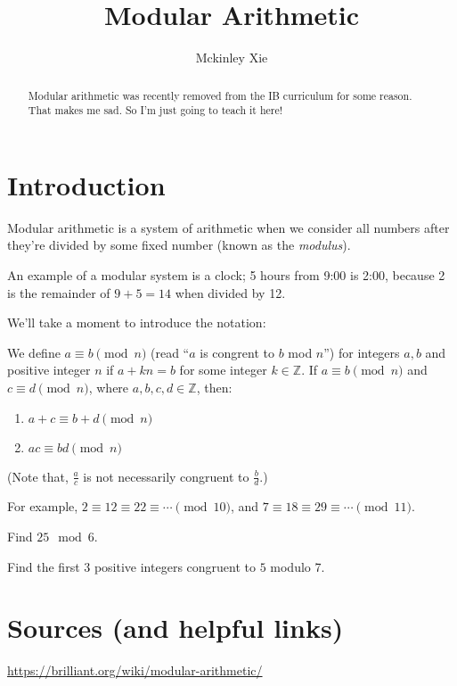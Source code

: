 \documentclass[a4paper]{scrartcl}
\title{Modular Arithmetic}
\author{Mckinley Xie}
\begin{document}
\maketitle
\begin{abstract}
	Modular arithmetic was recently removed from the IB curriculum for some reason. That makes me sad. So I'm just going to teach it here! 
\end{abstract}

\section{Introduction}
Modular arithmetic is a system of arithmetic when we consider all numbers after they're divided by some fixed number (known as the \emph{modulus}).

An example of a modular system is a clock; 5 hours from 9:00 is 2:00, because 2 is the remainder of $9 + 5 = 14$ when divided by 12.

We'll take a moment to introduce the notation:
\begin{theorem}
	We define $a \equiv b \pmod{n}$ (read ``$a$ is congrent to $b$ mod $n$'') for integers $a,b$ and positive integer $n$ if $a + kn = b$ for some integer $k \in \mathbb{Z}$.
	If $a \equiv b \pmod n$ and $c \equiv d \pmod n$, where $a,b,c,d \in \mathbb{Z}$, then:
	\begin{enumerate}
		\item $a + c \equiv b + d \pmod n$
		\item $ac \equiv bd \pmod n$
	\end{enumerate}
	(Note that, $\frac ac$ is not necessarily congruent to $\frac bd$.)
\end{theorem}
For example, $2 \equiv 12 \equiv 22 \equiv \cdots \pmod{10}$, and $7 \equiv 18 \equiv 29 \equiv \cdots \pmod{11}$.

\begin{exercise}
	Find $25 \mod 6$.
\end{exercise}
\begin{exercise}
	Find the first 3 positive integers congruent to $5$ modulo 7.
\end{exercise}


\section{Sources (and helpful links)}
\url{https://brilliant.org/wiki/modular-arithmetic/}
\end{document}
